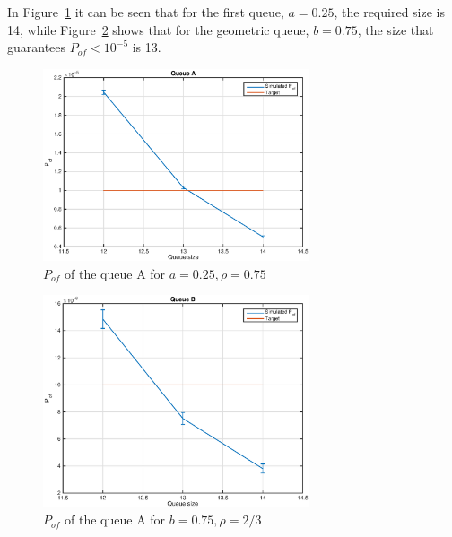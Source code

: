 \documentclass[10pt]{article}
\begin{document}
In Figure~\ref{fig:pofA} it can be seen that for the first queue, $a = 0.25$, the required size is 14, while Figure~\ref{fig:pofB} shows that for the geometric queue, $b = 0.75$, the size that guarantees $P_{of} < 10^{-5}$ is 13.

\begin{figure}[h!]
\centering
  \includegraphics[width = 0.7\textwidth]{queue_a_of}
  \caption{$P_{of}$ of the queue A for $a = 0.25, \rho = 0.75$}
  \label{fig:pofA}
\end{figure}

\begin{figure}[h!]
\centering
  \includegraphics[width = 0.7\textwidth]{queue_b_of}
  \caption{$P_{of}$ of the queue A for $b = 0.75, \rho = 2/3$}
  \label{fig:pofB}
\end{figure}

\clearpage
\end{document}

